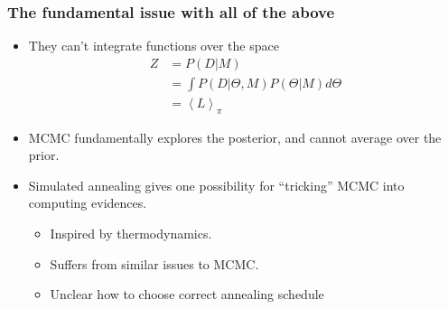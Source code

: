 \documentclass[aspectratio=169]{beamer}
\begin{document}
\begin{frame}
    \frametitle{The fundamental issue with all of the above} 

    \begin{itemize}
        \item They can't integrate functions over the space
            \begin{align}
                Z
                &= P(D|M) 
                \nonumber\\
                &= \int P(D|\Theta,M)P(\Theta|M) d\Theta 
                \nonumber\\
                &= \left\langle L \right\rangle_\pi
                \nonumber
            \end{align}
        \item MCMC fundamentally explores the posterior, and cannot average over the prior.
        \item Simulated annealing gives one possibility for ``tricking'' MCMC into computing evidences.
            \begin{itemize}
                \item Inspired by thermodynamics.
                \item Suffers from similar issues to MCMC.
                \item Unclear how to choose correct annealing schedule
            \end{itemize}
    \end{itemize}

\end{frame}
\end{document}
